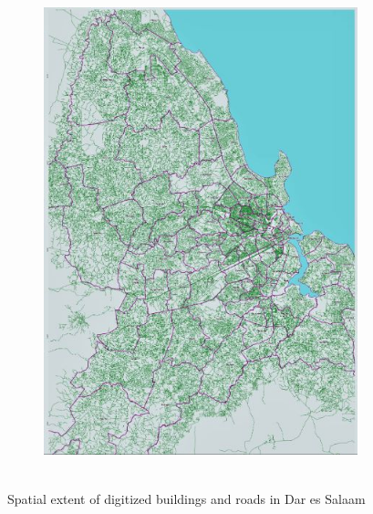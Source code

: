 \documentclass[a4paper,12pt,twoside]{article}
\begin{document}
\begin{figure}[h]
\begin{subfigure}[b]{0.27\textwidth}
    \includegraphics[width=\textwidth]{images/overview_highway.JPG}
    \label{fig:2}
  \end{subfigure}
\end{figure}

\begin{figure}[h]
	\centering
	\includegraphics[width=0\textwidth]{images/overview_highway.JPG}
	\caption{Spatial extent of digitized buildings and roads in Dar es Salaam}
\end{figure}
\end{document}
